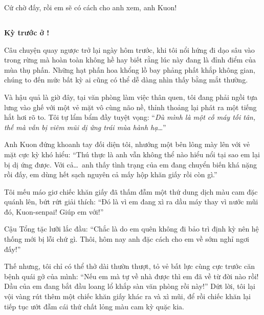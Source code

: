 \documentclass[../main.tex]{subfiles}
\begin{document}
Cứ chờ đấy, rồi em sẽ có cách cho anh xem, anh Kuon!

\subsection*{\label{ep-003.II}}

\begin{center}
  \textbf{Kỳ trước ở \hll !}
\end{center}


Câu chuyện quay ngược trở lại ngày hôm trước, khi tôi nổi hứng đi dạo sâu vào trong rừng mà hoàn toàn không hề hay biết rằng lúc này đang là đỉnh điểm của mùa thụ phấn. Những hạt phấn hoa khổng lồ bay phảng phất khắp không gian, chúng to đến mức bất kỳ ai cũng có thể dễ dàng nhìn thấy bằng mắt thường.


Và hậu quả là giờ đây, tại văn phòng làm việc thân quen, tôi đang phải ngồi tựa lưng vào ghế với một vẻ mặt vô cùng não nề, thỉnh thoảng lại phát ra một tiếng hắt hơi rõ to. Tôi tự lẩm bẩm đầy tuyệt vọng: ``\textit{Dù mình là một cỗ máy tối tân, thế mà vẫn bị viêm mũi dị ứng trái mùa hành hạ\dots}''

Anh Kuon đứng khoanh tay đối diện tôi, nhướng một bên lông mày lên với vẻ mặt cực kỳ khó hiểu: ``Thú thực là anh vẫn không thể nào hiểu nổi tại sao em lại bị dị ứng được. Với cả\dots\ anh thấy tình trạng của em đang chuyển biến khá nặng rồi đấy, em dùng hết sạch nguyên cả mấy hộp khăn giấy rồi còn gì.''

Tôi mếu máo giơ chiếc khăn giấy đã thấm đẫm một thứ dung dịch màu cam đặc quánh lên, bứt rứt giải thích: ``Đó là vì em đang xì ra dầu máy thay vì nước mũi đó, Kuon-senpai! Giúp em với!''

Cậu Tổng tặc lưỡi lắc đầu: ``Chắc là do em quên không đi bảo trì định kỳ nên hệ thống mới bị lỗi chứ gì. Thôi, hôm nay anh đặc cách cho em về sớm nghỉ ngơi đấy!''

Thế nhưng, tôi chỉ có thể thở dài thườn thượt, tỏ vẻ bất lực cùng cực trước căn bệnh quái gở của mình: ``Nếu em mà tự về nhà được thì em đã về từ đời nào rồi! Dầu của em đang bắt đầu loang lổ khắp sàn văn phòng rồi này!'' Dứt lời, tôi lại vội vàng rút thêm một chiếc khăn giấy khác ra và xì mũi, để rồi chiếc khăn lại tiếp tục ướt đẫm cái thứ chất lỏng màu cam kỳ quặc kia.
\end{document}
